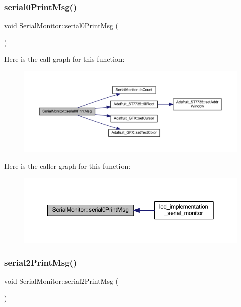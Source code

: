\subsubsection{\texorpdfstring{serial0\+Print\+Msg()}{serial0PrintMsg()}}
{\footnotesize\ttfamily void Serial\+Monitor\+::serial0\+Print\+Msg (\begin{DoxyParamCaption}{ }\end{DoxyParamCaption})}

Here is the call graph for this function\+:
\nopagebreak
\begin{figure}[H]
\begin{center}
\leavevmode
\includegraphics[width=350pt]{d3/dd4/class_serial_monitor_a2d27ad4a626b5856b5bfa2ea833ce4b6_cgraph}
\end{center}
\end{figure}
Here is the caller graph for this function\+:
\nopagebreak
\begin{figure}[H]
\begin{center}
\leavevmode
\includegraphics[width=350pt]{d3/dd4/class_serial_monitor_a2d27ad4a626b5856b5bfa2ea833ce4b6_icgraph}
\end{center}
\end{figure}
\mbox{\label{class_serial_monitor_adca14d5a90debc9e60b84e3aff902d20}} 
\subsubsection{\texorpdfstring{serial2\+Print\+Msg()}{serial2PrintMsg()}}
{\footnotesize\ttfamily void Serial\+Monitor\+::serial2\+Print\+Msg (\begin{DoxyParamCaption}{ }\end{DoxyParamCaption})}

